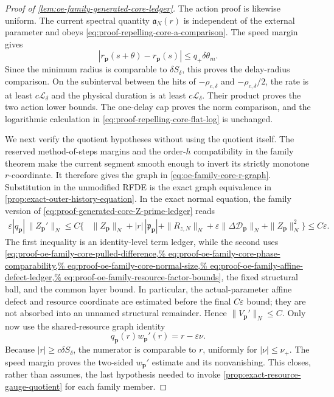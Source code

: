 \begin{proof}[Proof of
\cref{lem:oe-family-generated-core-ledger}]
The action proof is likewise uniform.  The current spectral quantity
\(\mathfrak a_N(r)\) is independent of the external parameter and obeys
\cref{eq:proof-repelling-core-a-comparison}.  The speed margin gives
\begin{equation}
 |r_{\mathbf p}(s+\theta)-r_{\mathbf p}(s)|
 \le q_+\delta\theta_m.                        \label{eq:proof-oe-family-core-delay-radius}
\end{equation}
Since the minimum radius is comparable to \(\delta S_\delta\), this
proves the delay-radius comparison.  On the subinterval between the hits
of \(-\rho_{c,\delta}\) and \(-\rho_{c,\delta}/2\), the rate is at least
\(c\mathscr L_\delta\) and the physical duration is at least
\(c\mathscr L_\delta\).  Their product proves the two action lower bounds.
The one-delay cap proves the norm comparison, and the logarithmic
calculation in \cref{eq:proof-repelling-core-flat-log} is unchanged.

We next verify the quotient hypotheses without using the quotient itself.
The reserved method-of-steps margins and the order-\(h\) compatibility in
the family theorem make the current segment smooth enough to invert its
strictly monotone \(r\)-coordinate.  It therefore gives the graph in
\cref{eq:oe-family-core-r-graph}.  Substitution in the unmodified RFDE is
the exact graph equivalence in
\cref{prop:exact-outer-history-equation}.  In the exact normal equation,
the family version of
\cref{eq:proof-generated-core-Z-prime-ledger} reads
\begin{align}
 \varepsilon|q_{\mathbf p}|\,\|Z_{\mathbf p}'\|_N
 \le C\{&\|Z_{\mathbf p}\|_N
       +|r|\,|\mathfrak p_{\mathbf p}|
       +\|R_{z,N}\|_N
       +\varepsilon\|\Delta\mathcal D_{\mathbf p}\|_N
       +\|Z_{\mathbf p}\|_N^2\}
 \le C\varepsilon.                             \label{eq:proof-oe-family-core-Z-prime}
\end{align}
The first inequality is an identity-level term ledger, while the second
uses
\cref{eq:proof-oe-family-core-pulled-difference,%
eq:proof-oe-family-core-phase-comparability,%
eq:proof-oe-family-core-normal-size,%
eq:proof-oe-family-affine-defect-ledger,%
eq:proof-oe-family-resource-factor-bounds}, the fixed structural ball,
and the common layer bound.  In particular, the actual-parameter affine
defect and resource coordinate are estimated before the final
\(C\varepsilon\) bound; they are not absorbed into an unnamed structural
remainder.  Hence \(\|V_{\mathbf p}'\|_N\le C\).  Only now use
the shared-resource graph identity
\begin{equation}
 q_{\mathbf p}(r)w_{\mathbf p}'(r)
 =r-\varepsilon\nu.                            \label{eq:proof-oe-family-core-resource-identity}
\end{equation}
Because \(|r|\ge c\delta S_\delta\), the numerator is comparable to
\(r\), uniformly for \(|\nu|\le\nu_+\).  The speed margin proves the
two-sided \(w_{\mathbf p}'\) estimate and its nonvanishing.  This closes,
rather than assumes, the last hypothesis needed to invoke
\cref{prop:exact-resource-gauge-quotient} for each family member.


\end{proof}
